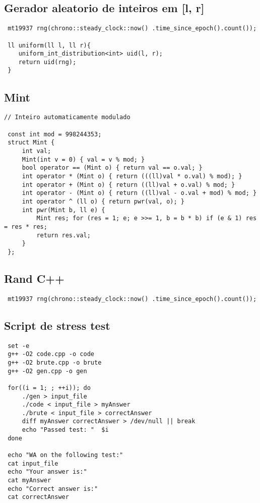\documentclass[11pt, a4paper, twoside]{article}
\begin{document}
\subsection{Gerador aleatorio de inteiros em [l, r]}
\begin{lstlisting}
 mt19937 rng(chrono::steady_clock::now() .time_since_epoch().count());
 
 ll uniform(ll l, ll r){
 	uniform_int_distribution<int> uid(l, r);
 	return uid(rng);
 }
\end{lstlisting}

\subsection{Mint}
\begin{lstlisting}
// Inteiro automaticamente modulado

 const int mod = 998244353;
 struct Mint {
     int val;
     Mint(int v = 0) { val = v % mod; }
     bool operator == (Mint o) { return val == o.val; }
     int operator * (Mint o) { return (((ll)val * o.val) % mod); }
     int operator + (Mint o) { return ((ll)val + o.val) % mod; }
     int operator - (Mint o) { return ((ll)val - o.val + mod) % mod; }
     int operator ^ (ll o) { return pwr(val, o); }
     int pwr(Mint b, ll e) {
         Mint res; for (res = 1; e; e >>= 1, b = b * b) if (e & 1) res = res * res;
         return res.val;
     }
 };
\end{lstlisting}

\subsection{Rand C++}
\begin{lstlisting}
 mt19937 rng(chrono::steady_clock::now() .time_since_epoch().count());
\end{lstlisting}

\subsection{Script de stress test}
\begin{lstlisting}
 set -e
 g++ -O2 code.cpp -o code
 g++ -O2 brute.cpp -o brute
 g++ -O2 gen.cpp -o gen
 
 for((i = 1; ; ++i)); do
     ./gen > input_file
     ./code < input_file > myAnswer
     ./brute < input_file > correctAnswer
     diff myAnswer correctAnswer > /dev/null || break
     echo "Passed test: "  $i
 done
 
 echo "WA on the following test:"
 cat input_file
 echo "Your answer is:"
 cat myAnswer
 echo "Correct answer is:"
 cat correctAnswer
\end{lstlisting}
\end{document}
